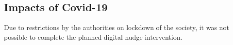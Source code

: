 \subsection{Impacts of Covid-19}
Due to restrictions by the authorities on lockdown of the society, it was not possible to complete the planned digital nudge intervention. 




